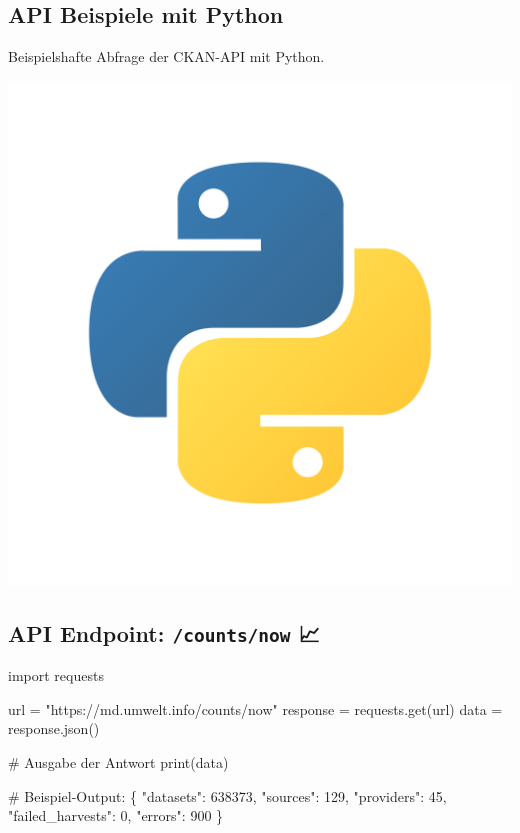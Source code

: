 \documentclass[
  letterpaper,
  DIV=11]{scrartcl}
\newenvironment{Shaded}{\begin{snugshade}}{\end{snugshade}}
\newcommand{\BuiltInTok}[1]{\textcolor[rgb]{0.00,0.23,0.31}{#1}}
\newcommand{\CommentTok}[1]{\textcolor[rgb]{0.37,0.37,0.37}{#1}}
\newcommand{\DecValTok}[1]{\textcolor[rgb]{0.68,0.00,0.00}{#1}}
\newcommand{\ImportTok}[1]{\textcolor[rgb]{0.00,0.46,0.62}{#1}}
\newcommand{\NormalTok}[1]{\textcolor[rgb]{0.00,0.23,0.31}{#1}}
\newcommand{\OperatorTok}[1]{\textcolor[rgb]{0.37,0.37,0.37}{#1}}
\newcommand{\StringTok}[1]{\textcolor[rgb]{0.13,0.47,0.30}{#1}}
\begin{document}
\subsection{API Beispiele mit Python}\label{api-beispiele-mit-python}

Beispielshafte Abfrage der CKAN-API mit Python. \begin{center}
\includegraphics[width=0.35\linewidth,height=0.35\textheight]{images/python_logo.png}
\end{center}

\subsection{\texorpdfstring{API Endpoint: \textbf{\texttt{/counts/now}}
📈}{API Endpoint: /counts/now 📈}}\label{api-endpoint-countsnow}

\begin{Shaded}
\begin{Highlighting}[]
\ImportTok{import}\NormalTok{ requests}

\NormalTok{url }\OperatorTok{=} \StringTok{"https://md.umwelt.info/counts/now"}
\NormalTok{response }\OperatorTok{=}\NormalTok{ requests.get(url)}
\NormalTok{data }\OperatorTok{=}\NormalTok{ response.json()}

\CommentTok{\# Ausgabe der Antwort}
\BuiltInTok{print}\NormalTok{(data)}
\end{Highlighting}
\end{Shaded}

\begin{Shaded}
\begin{Highlighting}[]
\CommentTok{\# Beispiel{-}Output:}
\NormalTok{\{}
    \StringTok{"datasets"}\NormalTok{: }\DecValTok{638373}\NormalTok{,}
    \StringTok{"sources"}\NormalTok{: }\DecValTok{129}\NormalTok{,}
    \StringTok{"providers"}\NormalTok{: }\DecValTok{45}\NormalTok{,}
    \StringTok{"failed\_harvests"}\NormalTok{: }\DecValTok{0}\NormalTok{,}
    \StringTok{"errors"}\NormalTok{: }\DecValTok{900}
\NormalTok{\}}
\end{Highlighting}
\end{Shaded}
\end{document}
